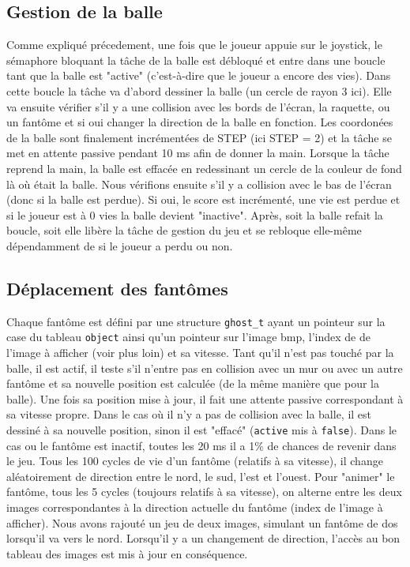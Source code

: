 \documentclass[a4paper]{article}
\begin{document}
\subsection{Gestion de la balle}
Comme expliqué précedement, une fois que le joueur appuie sur le joystick, le sémaphore
bloquant la tâche de la balle est débloqué et entre dans une boucle tant que
la balle est "active" (c'est-à-dire que le joueur a encore des vies). Dans cette boucle
la tâche va d'abord dessiner la balle (un cercle de rayon 3 ici). Elle va ensuite vérifier
s'il y a une collision avec les bords de l'écran, la raquette, ou un fantôme et si oui changer
la direction de la balle en fonction. Les coordonées de la balle sont finalement
incrémentées de STEP (ici STEP = 2) et la tâche se met en attente passive pendant
10 ms afin de donner la main.
\newline
Lorsque la tâche reprend la main, la balle est effacée en redessinant un cercle
de la couleur de fond là où était la balle. Nous vérifions ensuite s'il y a collision
avec le bas de l'écran (donc si la balle est perdue). Si oui, le score est incrémenté,
une vie est perdue et si le joueur est à 0 vies la balle devient "inactive". Après,
soit la balle refait la boucle, soit elle libère la tâche de gestion du jeu et se
rebloque elle-même dépendamment de si le joueur a perdu ou non.

\subsection{Déplacement des fantômes}
Chaque fantôme est défini par une structure \texttt{ghost_t} ayant un pointeur sur
la case du tableau \texttt{object} ainsi qu'un pointeur sur l'image bmp, l'index de
de l'image à afficher (voir plus loin) et sa vitesse. Tant qu'il n'est pas touché par la balle,
il est actif, il teste s'il n'entre pas en collision avec un mur ou avec un autre fantôme et
sa nouvelle position est calculée (de la même manière que pour la balle). Une fois sa position
mise à jour, il fait une attente passive correspondant à sa vitesse propre. Dans le cas où il
n'y a pas de collision avec la balle, il est dessiné à sa nouvelle position, sinon il est "effacé"
(\texttt{active} mis à \texttt{false}).
\newline
Dans le cas ou le fantôme est inactif,
toutes les 20 ms il a 1\% de chances de revenir dans le jeu. Tous les 100 cycles de vie d'un
fantôme (relatifs à sa vitesse), il change aléatoirement de direction entre le nord,
le sud, l'est et l'ouest. Pour "animer" le fantôme, tous les 5 cycles (toujours relatifs à sa
vitesse), on alterne entre les deux images correspondantes à la direction actuelle du fantôme
(index de l'image à afficher).
Nous avons rajouté un jeu de deux images, simulant un fantôme de dos lorsqu'il
va vers le nord. Lorsqu'il y a un changement de direction, l'accès au bon tableau des images
est mis à jour en conséquence.
\end{document}
